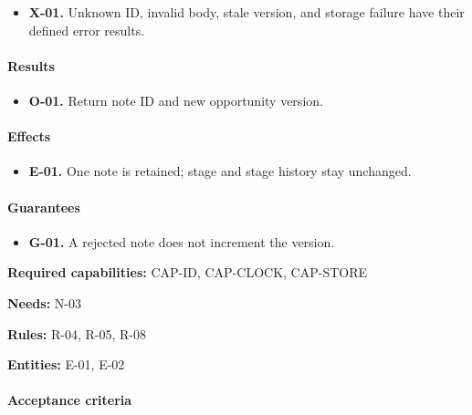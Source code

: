 \documentclass[10pt,a4paper]{article}
\begin{document}
\begin{itemize}

\item \textbf{X-01.} Unknown ID, invalid body, stale version, and storage failure have their defined error results.

\end{itemize}

\paragraph{Results}

\begin{itemize}

\item \textbf{O-01.} Return note ID and new opportunity version.

\end{itemize}

\paragraph{Effects}

\begin{itemize}

\item \textbf{E-01.} One note is retained; stage and stage history stay unchanged.

\end{itemize}

\paragraph{Guarantees}

\begin{itemize}

\item \textbf{G-01.} A rejected note does not increment the version.

\end{itemize}

\textbf{Required capabilities:} CAP-ID, CAP-CLOCK, CAP-STORE

\textbf{Needs:} N-03

\textbf{Rules:} R-04, R-05, R-08

\textbf{Entities:} E-01, E-02

\paragraph{Acceptance criteria}
\end{document}

